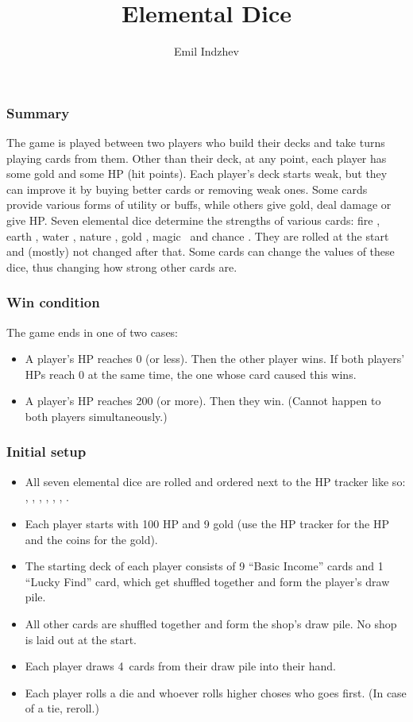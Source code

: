 \documentclass[dvipsnames,parskip,a4paper]{scrartcl}
\title{Elemental Dice}
\author{Emil Indzhev}
\newcommand{\iconsize}{3.4mm}
\newcommand{\icondepth}{0.45mm}
\newcommand{\icon}[1]{\raisebox{-\icondepth}{\texttt{[image:  \#1 ]}}}
\newcommand{\fire}{\icon{icons/fire.png}}
\newcommand{\earth}{\icon{icons/earth.png}}
\newcommand{\water}{\icon{icons/water.png}}
\newcommand{\nature}{\icon{icons/nature.png}}
\newcommand{\magic}{\icon{icons/magic.png}}
\newcommand{\gold}{\icon{icons/gold.png}}
\newcommand{\chance}{\icon{icons/chance.png}}
\newcommand{\handsize}{4}
\begin{document}
\maketitle

\subsubsection*{Summary}

The game is played between two players who build their decks and take turns playing cards from them. Other than their deck, at any point, each player has some gold and some HP (hit points). Each player's deck starts weak, but they can improve it by buying better cards or removing weak ones. Some cards provide various forms of utility or buffs, while others give gold, deal damage or give HP. Seven elemental dice determine the strengths of various cards: fire \fire, earth \earth, water \water, nature \nature, gold \gold, magic \magic \ and chance \chance. They are rolled at the start and (mostly) not changed after that. Some cards can change the values of these dice, thus changing how strong other cards are.

\subsubsection*{Win condition}

The game ends in one of two cases:

\begin{itemize}
\item A player's HP reaches 0 (or less). Then the other player wins. If both players' HPs reach 0 at the same time, the one whose card caused this wins.
\item A player's HP reaches 200 (or more). Then they win. (Cannot happen to both players simultaneously.)
\end{itemize}

\subsubsection*{Initial setup}

\begin{itemize}
\item All seven elemental dice are rolled and ordered next to the HP tracker like so: \fire, \earth, \water, \nature, \gold, \magic, \chance.
\item Each player starts with 100 HP and 9 gold (use the HP tracker for the HP and the coins for the gold).
\item The starting deck of each player consists of 9 ``Basic Income'' cards and 1 ``Lucky Find'' card, which get shuffled together and form the player's draw pile.
\item All other cards are shuffled together and form the shop's draw pile. No shop is laid out at the start.
\item Each player draws \handsize \ cards from their draw pile into their hand.
\item Each player rolls a die and whoever rolls higher choses who goes first. (In case of a tie, reroll.)
\end{itemize}
\end{document}
